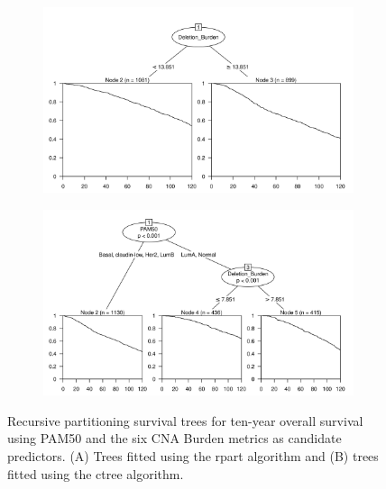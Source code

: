 \begin{figure}[!htb]
\centering

\vspace{0.5cm}

\begin{subfigure}{\textwidth}
\subcaption{}
\includegraphics[width=1\textwidth]{../figures/Appendices/Appendix_B/PartyKit_Survival_Burden_TenYearOS_PAM50.png}
\end{subfigure}

\vspace{2cm}

\begin{subfigure}{\textwidth}
\subcaption{}
\includegraphics[width=1\textwidth]{../figures/Appendices/Appendix_B/Ctree_Survival_Burden_TenYearOS_PAM50.png}
\end{subfigure}

\vspace{0.5cm}

\caption[Recursive partitioning survival trees for ten-year overall survival using PAM50 and the six CNA Burden metrics as candidate predictors.]{Recursive partitioning survival trees for ten-year overall survival using PAM50 and the six CNA Burden metrics as candidate predictors. (A) Trees fitted using the rpart algorithm and (B) trees fitted using the ctree algorithm.}
\end{figure}

